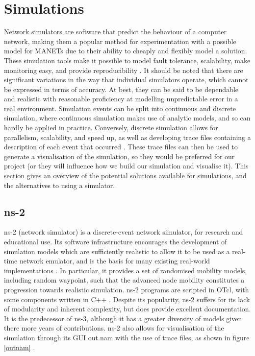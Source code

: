 \section{Simulations}
\label{simSoft}
Network simulators are software that predict the behaviour of a computer network, making them a popular method for experimentation with a possible model for MANETs due to their ability to cheaply and flexibly model a solution. These simulation tools make it possible to model fault tolerance, scalability, make monitoring easy, and provide reproducibility \cite{stuartkurkowski2005}. It should be noted that there are significant variations in the way that individual simulators operate, which cannot be expressed in terms of accuracy. At best, they can be said to be dependable and realistic with reasonable proficiency at modelling unpredictable error in a real environment. Simulation events can be split into continuous and discrete simulation, where continuous simulation makes use of analytic models, and so can hardly be applied in practice. Conversely, discrete simulation allows for parallelism, scalability, and speed up, as well as developing trace files containing a description of each event that occurred \cite{luchogie2006}. These trace files can then be used to generate a visualisation of the simulation, so they would be preferred for our project (or they will influence how we build our simulation and visualise it). This section gives an overview of the potential solutions available for simulations, and the alternatives to using a simulator.

\subsection{ns-2}
ns-2 (network simulator) is a discrete-event network simulator, for research and educational use. Its software infrastructure encourages the development of simulation models which are sufficiently realistic to allow it to be used as a real-time network emulator, and is the basis for many existing real-world implementations \cite{tommasopecorella2016}. In particular, it provides a set of randomised mobility models, including random waypoint, such that the advanced node mobility constitutes a progression towards realistic simulation. ns-2 programs are scripted in OTcl, with some components written in C++ . Despite its popularity, ns-2 suffers for its lack of modularity and inherent complexity, but does provide excellent documentation. It is the predecessor of ns-3, although it has a greater diversity of models given there more years of contributions. ns-2 also allows for visualisation of the simulation through its GUI out.nam with the use of trace files, as shown in figure \ref{outnam} \cite{luchogie2006}.

